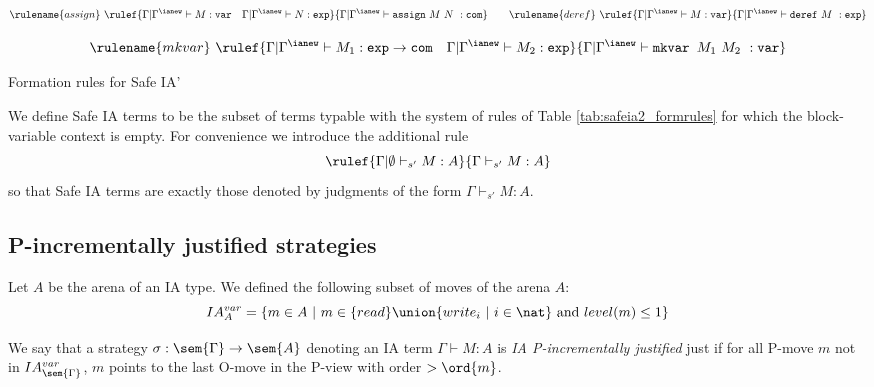 \begin{FramedTable}
$$ \rulename{assign} \ \rulef{\Gamma| \Gamma^{\ianew} \vdash M : \texttt{var} \quad \Gamma| \Gamma^{\ianew} \vdash N : \texttt{exp}}
    {\Gamma| \Gamma^{\ianew} \vdash \texttt{assign}\ M\ N\ : \texttt{com}}
\qquad
 \rulename{deref} \ \rulef{\Gamma| \Gamma^{\ianew} \vdash M : \texttt{var}}
    {\Gamma| \Gamma^{\ianew} \vdash \texttt{deref}\ M\ : \texttt{exp}}$$


\begin{center}\end{center}

$$ \rulename{mkvar} \ \rulef{\Gamma| \Gamma^{\ianew} \vdash M_1 : \texttt{exp} \rightarrow \texttt{com} \quad \Gamma| \Gamma^{\ianew} \vdash M_2 : \texttt{exp}}
    {\Gamma| \Gamma^{\ianew} \vdash \texttt{mkvar } M_1\ M_2\ : \texttt{var}}$$

\caption{Formation rules for Safe IA'}
\label{tab:safeia2_formrules}
\end{FramedTable}

 We define Safe IA terms to be the subset of terms typable with
the system of rules of Table \ref{tab:safeia2_formrules} for which
the block-variable context is empty.
For convenience we introduce the additional rule
$$ \rulef{\Gamma | \emptyset \vdash_{s'} M : A} {\Gamma \vdash_{s'} M : A}$$
so that Safe IA terms are exactly those denoted by judgments of the form $\Gamma \vdash_{s'} M : A$.


\subsection{P-incrementally justified strategies}

Let $A$ be the arena of an IA type. We defined the following subset
of moves of the arena $A$:
$$ IA^{var}_{A} =\{ m \in A \ | \ m \in \{ read \} \union \{ write_i \ | \ i \in \nat \} \mbox{ and } level(m) \leq 1 \} $$



We say that a strategy $\sigma : \sem{\Gamma} \rightarrow \sem{A}$
denoting an IA term $\Gamma \vdash M :A$ is \emph{IA P-incrementally
justified} just if for all P-move $m$ not in
$IA^{var}_{\sem{\Gamma}}$, $m$ points to the last O-move in the
P-view with order $> \ord{m}$.






